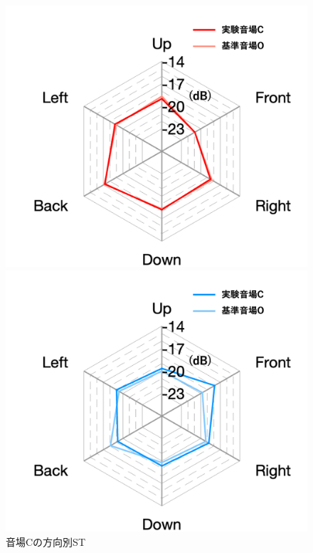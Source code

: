 \documentclass[11pt,a4j]{jreport}
\begin{document}
  \newpage

  \begin{figure}[H]
    \begin{minipage}[b]{.5\linewidth}
      \centering
      \includegraphics[width=1\linewidth]{images/experimentField/withLegend/expCEarly.png}
    \end{minipage}%
    \begin{minipage}[b]{.5\linewidth}
        \centering
        \includegraphics[width=1\linewidth]{images/experimentField/withLegend/expCLate.png}
    \end{minipage}
    \caption{音場Cの方向別ST}
    \label{fig:音場Cの方向別ST}
  \end{figure}
\end{document}
